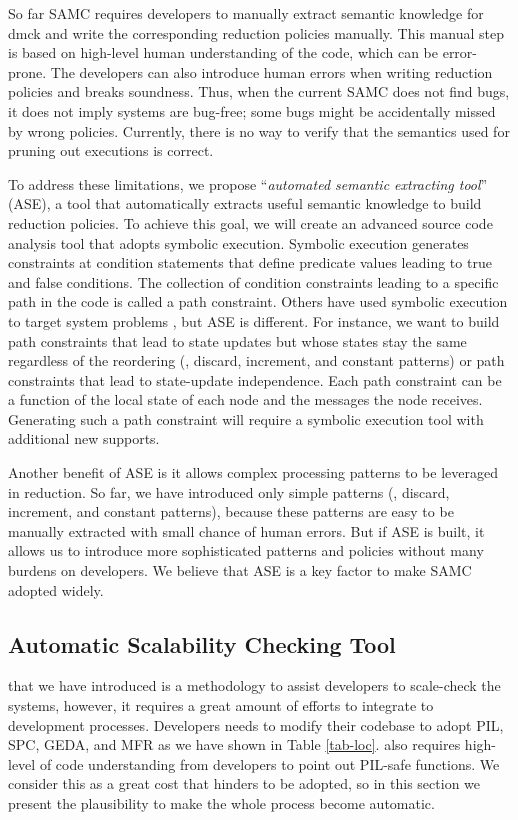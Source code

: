 So far SAMC requires developers to manually extract semantic knowledge for dmck
and write the corresponding reduction policies manually. This manual step is
based on high-level human understanding of the code, which can be error-prone.
The developers can also introduce human errors when writing reduction policies
and breaks soundness. Thus, when the current SAMC does not find bugs, it does
not imply systems are bug-free; some bugs might be accidentally missed by wrong
policies. Currently, there is no way to verify that the semantics used for
pruning out executions is correct.

To address these limitations, we propose ``\textit{automated semantic extracting
tool}'' (ASE), a tool that automatically extracts useful semantic knowledge to
build reduction policies. To achieve this goal, we will create an advanced
source code analysis tool that adopts symbolic execution. Symbolic execution
generates constraints at condition statements that define predicate values
leading to true and false conditions. The collection of condition constraints
leading to a specific path in the code is called a path constraint. Others have
used symbolic execution to target system problems
\cite{Bucur+14-SymbolicExecution}, but ASE is different. For instance, we want
to build path constraints that lead to state updates but whose states stay the
same regardless of the reordering (\eg, discard, increment, and constant
patterns) or path constraints that lead to state-update independence. Each path
constraint can be a function of the local state of each node and the messages
the node receives. Generating such a path constraint will require a symbolic
execution tool with additional new supports.

Another benefit of ASE is it allows complex processing patterns to be leveraged
in reduction. So far, we have introduced only simple patterns (\eg, discard,
increment, and constant patterns), because these patterns are easy to be
manually extracted with small chance of human errors. But if ASE is built, it
allows us to introduce more sophisticated patterns and policies without many
burdens on developers. We believe that ASE is a key factor to make SAMC adopted
widely.

\subsection{Automatic Scalability Checking Tool}

\sck that we have introduced is a methodology to assist developers to
scale-check the systems, however, it requires a great amount of efforts to
integrate to development processes.  Developers needs to modify their codebase
to adopt PIL, SPC, GEDA, and MFR as we have shown in Table \ref{tab-loc}. \sck
also requires high-level of code understanding from developers to point out
PIL-safe functions. We consider this as a great cost that hinders \sck to be
adopted, so in this section we present the plausibility to make the whole
process become automatic.

